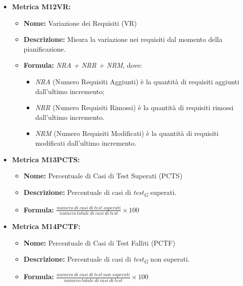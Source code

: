 \begin{itemize}
    \item \hypertarget{item:M12VR}{\textbf{Metrica M12VR:}}
    \begin{minipage}[t]{0.9\textwidth}
          \begin{itemize}
              \item \textbf{Nome:} Variazione dei Requisiti (VR)
              \item \textbf{Descrizione:} Misura la variazione nei requisiti dal momento della pianificazione.
              \item \textbf{Formula:} \textit{NRA + NRR + NRM}, dove:\begin{itemize}
                \item \textit{NRA} (Numero Requisiti Aggiunti) è la quantità di requisiti aggiunti dall'ultimo incremento;
                \item \textit{NRR} (Numero Requisiti Rimossi) è la quantità di requisiti rimossi dall'ultimo incremento.
                \item \textit{NRM} (Numero Requisiti Modificati) è la quantità di requisiti modificati dall'ultimo incremento.
              \end{itemize}
          \end{itemize}
        \end{minipage}
    
    \item \hypertarget{item:M13PCTS}{\textbf{Metrica M13PCTS:}}
    \begin{minipage}[t]{0.9\textwidth}
          \begin{itemize}
           \item \textbf{Nome:} Percentuale di Casi di Test Superati (PCTS)
           \item \textbf{Descrizione:} Percentuale di casi di \textit{test}\textsubscript{\textit{G}} superati.
           \item \textbf{Formula:} $\frac{numero \ di \ casi \ di \ test \ superati}{numero \ totale \ di \ casi \ di \ test}\times 100$
          \end{itemize}
        \end{minipage}

    \item \hypertarget{item:M14PCTF}{\textbf{Metrica M14PCTF:}}
    \begin{minipage}[t]{0.9\textwidth}
          \begin{itemize}
           \item \textbf{Nome:} Percentuale di Casi di Test Falliti (PCTF)
           \item \textbf{Descrizione:} Percentuale di casi di \textit{test}\textsubscript{\textit{G}} non superati.
           \item \textbf{Formula:} $\frac{numero \ di \ casi \ di \ test \ non \ superati}{numero \ totale \ di \ casi \ di \ test}\times 100$
          \end{itemize}
        \end{minipage}


\end{itemize}

